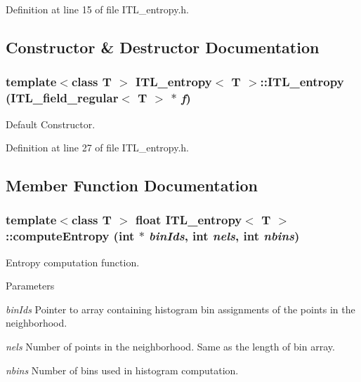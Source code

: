 Definition at line 15 of file ITL\_\-entropy.h.



\subsection{Constructor \& Destructor Documentation}
\hypertarget{classITL__entropy_a1f446a47b389fe894139cefd9843c0dc}{
\subsubsection[{ITL\_\-entropy}]{\setlength{\rightskip}{0pt plus 5cm}template$<$class T $>$ {\bf ITL\_\-entropy}$<$ T $>$::{\bf ITL\_\-entropy} ({\bf ITL\_\-field\_\-regular}$<$ T $>$ $\ast$ {\em f})}}
\label{classITL__entropy_a1f446a47b389fe894139cefd9843c0dc}


Default Constructor. 



Definition at line 27 of file ITL\_\-entropy.h.



\subsection{Member Function Documentation}
\hypertarget{classITL__entropy_a2c5655a1f68d7942dc98d98fe330660a}{
\subsubsection[{computeEntropy}]{\setlength{\rightskip}{0pt plus 5cm}template$<$class T $>$ float {\bf ITL\_\-entropy}$<$ T $>$::computeEntropy (int $\ast$ {\em binIds}, \/  int {\em nels}, \/  int {\em nbins})}}
\label{classITL__entropy_a2c5655a1f68d7942dc98d98fe330660a}


Entropy computation function. 


\begin{DoxyParams}{Parameters}
\item[{\em binIds}]Pointer to array containing histogram bin assignments of the points in the neighborhood. \item[{\em nels}]Number of points in the neighborhood. Same as the length of bin array. \item[{\em nbins}]Number of bins used in histogram computation. \end{DoxyParams}


